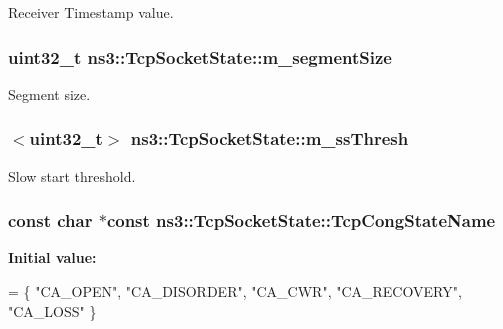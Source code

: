 Receiver Timestamp value. 

\subsubsection[{\texorpdfstring{m\+\_\+segment\+Size}{m_segmentSize}}]{\setlength{\rightskip}{0pt plus 5cm}uint32\+\_\+t ns3\+::\+Tcp\+Socket\+State\+::m\+\_\+segment\+Size}\hypertarget{classns3_1_1TcpSocketState_a079872f7b0099ef5f3cab4ff47bd2edd}{}\label{classns3_1_1TcpSocketState_a079872f7b0099ef5f3cab4ff47bd2edd}


Segment size. 

\subsubsection[{\texorpdfstring{m\+\_\+ss\+Thresh}{m_ssThresh}}]{$<$uint32\+\_\+t$>$ ns3\+::\+Tcp\+Socket\+State\+::m\+\_\+ss\+Thresh}\hypertarget{classns3_1_1TcpSocketState_aec003b6dba9d269bfb1036c7652ffbd6}{}\label{classns3_1_1TcpSocketState_aec003b6dba9d269bfb1036c7652ffbd6}


Slow start threshold. 

\subsubsection[{\texorpdfstring{Tcp\+Cong\+State\+Name}{TcpCongStateName}}]{\setlength{\rightskip}{0pt plus 5cm}const char $\ast$const ns3\+::\+Tcp\+Socket\+State\+::\+Tcp\+Cong\+State\+Name\hspace{0.3cm}{\ttfamily [static]}}\hypertarget{classns3_1_1TcpSocketState_a5ef7513bf909c4d8b728cb8d25ad4a3b}{}\label{classns3_1_1TcpSocketState_a5ef7513bf909c4d8b728cb8d25ad4a3b}
{\bfseries Initial value\+:}
\begin{DoxyCode}
=
\{
  \textcolor{stringliteral}{"CA\_OPEN"}, \textcolor{stringliteral}{"CA\_DISORDER"}, \textcolor{stringliteral}{"CA\_CWR"}, \textcolor{stringliteral}{"CA\_RECOVERY"}, \textcolor{stringliteral}{"CA\_LOSS"}
\}
\end{DoxyCode}


